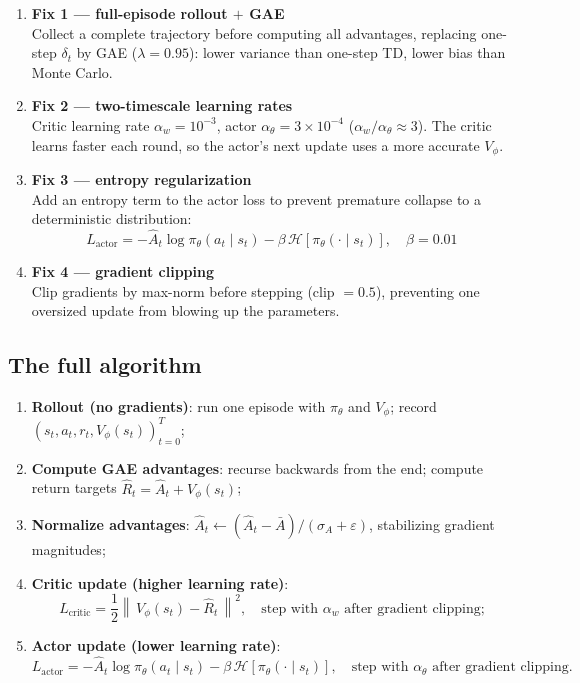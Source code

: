 \documentclass{article}
\begin{document}
\begin{enumerate}
  \item \textbf{Fix 1 --- full-episode rollout $+$ GAE}\\
        Collect a complete trajectory before computing all advantages, replacing one-step $\delta_t$ by GAE ($\lambda = 0.95$): lower variance than one-step TD, lower bias than Monte Carlo.

  \item \textbf{Fix 2 --- two-timescale learning rates}\\
        Critic learning rate $\alpha_w = 10^{-3}$, actor $\alpha_\theta = 3\times 10^{-4}$ ($\alpha_w / \alpha_\theta \approx 3$). The critic learns faster each round, so the actor's next update uses a more accurate $V_\phi$.

  \item \textbf{Fix 3 --- entropy regularization}\\
        Add an entropy term to the actor loss to prevent premature collapse to a deterministic distribution:
        \[
        L_{\text{actor}} = -\hat{A}_t \log\pi_\theta(a_t \mid s_t) - \beta\,\mathcal{H}[\pi_\theta(\cdot \mid s_t)], \quad \beta = 0.01
        \]

  \item \textbf{Fix 4 --- gradient clipping}\\
        Clip gradients by max-norm before stepping (clip $= 0.5$), preventing one oversized update from blowing up the parameters.
\end{enumerate}

\subsection*{The full algorithm}

\begin{enumerate}
  \item \textbf{Rollout (no gradients)}: run one episode with $\pi_\theta$ and $V_\phi$; record $(s_t,a_t,r_t,V_\phi(s_t))_{t=0}^{T}$;
  \item \textbf{Compute GAE advantages}: recurse backwards from the end; compute return targets $\hat{R}_t = \hat{A}_t + V_\phi(s_t)$;
  \item \textbf{Normalize advantages}: $\hat{A}_t \leftarrow (\hat{A}_t - \bar{A}) / (\sigma_A + \varepsilon)$, stabilizing gradient magnitudes;
  \item \textbf{Critic update (higher learning rate)}:
        \[
        L_{\text{critic}} = \frac{1}{2}\left\|\,V_\phi(s_t) - \hat{R}_t\,\right\|^2,
        \quad \text{step with } \alpha_w \text{ after gradient clipping;}
        \]
  \item \textbf{Actor update (lower learning rate)}:
        \[
        L_{\text{actor}} = -\hat{A}_t\log\pi_\theta(a_t \mid s_t) - \beta\,\mathcal{H}[\pi_\theta(\cdot\mid s_t)],
        \quad \text{step with } \alpha_\theta \text{ after gradient clipping.}
        \]
\end{enumerate}
\end{document}

